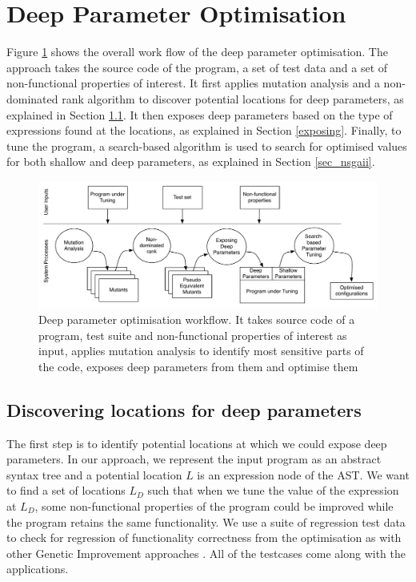 \section{Deep Parameter Optimisation}
\label{sec_deep_parameter_optimisation}

Figure \ref{system} shows the overall work flow of the deep parameter optimisation. The approach takes the source code of the program, a set of test data and a set of non-functional properties of interest. 
It first applies mutation analysis and a non-dominated rank algorithm to discover potential locations for deep parameters, as explained in Section \ref{discovering}. It then exposes deep parameters based on the type of expressions found at the locations, as explained in Section \ref{exposing}. Finally, to tune the program, a search-based algorithm is used to search for optimised values for both shallow and deep parameters, as explained in Section \ref{sec_nsgaii}.

\begin{figure}[htbp]
\centering
\includegraphics[width=6.2in]{pics/new_system}
\caption{Deep parameter optimisation workflow. It takes source code of a program, test suite and non-functional properties of interest as input, applies mutation analysis to identify most sensitive parts of the code, exposes deep parameters from them and optimise them}\label{system}
\end{figure}

\subsection{Discovering locations for deep parameters}
\label{discovering}
The first step is to identify potential locations at which we could expose deep parameters. 
In our approach, we represent the input program as an abstract syntax tree and a potential location $L$ is an expression node of the AST. 
We want to find a set of locations $L_D$ such that when we tune the value of the expression at $L_D$, some non-functional properties of the program could be improved while the program retains the same functionality. 
We use a suite of regression test data to check for regression of functionality correctness from the optimisation as with other Genetic Improvement approaches \cite{justyna2013, Langdon:2014:IMI:2576768.2598244}. All of the testcases come along with the applications.

